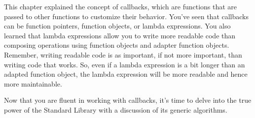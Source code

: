 This chapter explained the concept of callbacks, which are functions that are passed to other functions to customize their behavior. You’ve seen that callbacks can be function pointers, function objects, or lambda expressions. You also learned that lambda expressions allow you to write more readable code than composing operations using function objects and adapter function objects. Remember, writing readable code is as important, if not more important, than writing code that works. So, even if a lambda expression is a bit longer than an adapted function object, the lambda expression will be more readable and hence more maintainable.

Now that you are fluent in working with callbacks, it’s time to delve into the true power of the Standard Library with a discussion of its generic algorithms.